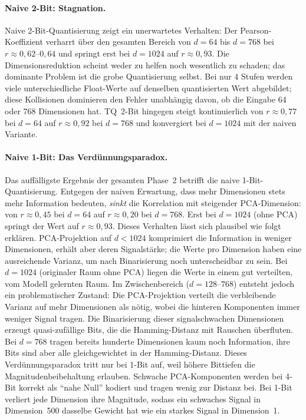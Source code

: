 \paragraph{Naive 2-Bit: Stagnation.}
Naive 2-Bit-Quantisierung zeigt ein unerwartetes Verhalten: Der Pearson-Koeffizient verharrt über den gesamten Bereich von $d = 64$ bis $d = 768$ bei $r \approx 0{,}62$--$0{,}64$ und springt erst bei $d = 1024$ auf $r \approx 0{,}93$.
Die Dimensionsreduktion scheint weder zu helfen noch wesentlich zu schaden; das dominante Problem ist die grobe Quantisierung selbst.
Bei nur 4 Stufen werden viele unterschiedliche Float-Werte auf denselben quantisierten Wert abgebildet; diese Kollisionen dominieren den Fehler unabhängig davon, ob die Eingabe 64 oder 768 Dimensionen hat.
TQ~2-Bit hingegen steigt kontinuierlich von $r \approx 0{,}77$ bei $d = 64$ auf $r \approx 0{,}92$ bei $d = 768$ und konvergiert bei $d = 1024$ mit der naiven Variante.
%
\paragraph{Naive 1-Bit: Das Verdünnungsparadox.}
Das auffälligste Ergebnis der gesamten Phase~2 betrifft die naive 1-Bit-Quantisierung.
Entgegen der naiven Erwartung, dass mehr Dimensionen stets mehr Information bedeuten, \emph{sinkt} die Korrelation mit steigender PCA-Dimension: von $r \approx 0{,}45$ bei $d = 64$ auf $r \approx 0{,}20$ bei $d = 768$.
Erst bei $d = 1024$ (ohne PCA) springt der Wert auf $r \approx 0{,}93$.
%
Dieses Verhalten lässt sich plausibel wie folgt erklären.
PCA-Projektion auf $d < 1024$ komprimiert die Information in weniger Dimensionen, erhält aber deren Signalstärke; die Werte pro Dimension haben eine ausreichende Varianz, um nach Binarisierung noch unterscheidbar zu sein.
Bei $d = 1024$ (originaler Raum ohne PCA) liegen die Werte in einem gut verteilten, vom Modell gelernten Raum.
Im Zwischenbereich ($d = 128$--$768$) entsteht jedoch ein problematischer Zustand: Die PCA-Projektion verteilt die verbleibende Varianz auf mehr Dimensionen als nötig, wobei die hinteren Komponenten immer weniger Signal tragen.
Die Binarisierung dieser signalschwachen Dimensionen erzeugt quasi-zufällige Bits, die die Hamming-Distanz mit Rauschen überfluten.
Bei $d = 768$ tragen bereits hunderte Dimensionen kaum noch Information, ihre Bits sind aber alle gleichgewichtet in der Hamming-Distanz.
%
Dieses Verdünnungsparadox tritt nur bei 1-Bit auf, weil höhere Bittiefen die Magnitudenbeibehaltung erlauben.
Schwache PCA-Komponenten werden bei 4-Bit korrekt als \enquote{nahe Null} kodiert und tragen wenig zur Distanz bei.
Bei 1-Bit verliert jede Dimension ihre Magnitude, sodass ein schwaches Signal in Dimension~500 dasselbe Gewicht hat wie ein starkes Signal in Dimension~1.
%
